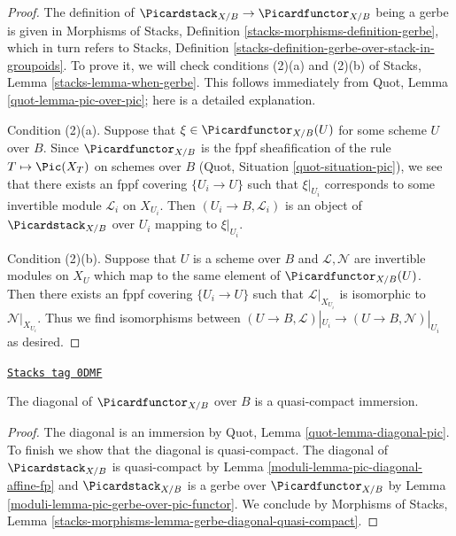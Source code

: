 \begin{proof}
The definition of $\Picardstack_{X/B} \to \Picardfunctor_{X/B}$ being
a gerbe is given in Morphisms of Stacks, Definition
\ref{stacks-morphisms-definition-gerbe}, which in turn refers to
Stacks, Definition \ref{stacks-definition-gerbe-over-stack-in-groupoids}.
To prove it, we will check conditions (2)(a) and (2)(b) of
Stacks, Lemma \ref{stacks-lemma-when-gerbe}. This follows immediately from
Quot, Lemma \ref{quot-lemma-pic-over-pic}; here is a detailed explanation.

\medskip\noindent
Condition (2)(a).
Suppose that $\xi \in \Picardfunctor_{X/B}(U)$ for some scheme $U$ over $B$.
Since $\Picardfunctor_{X/B}$ is the fppf sheafification of the rule
$T \mapsto \Pic(X_T)$ on schemes over $B$
(Quot, Situation \ref{quot-situation-pic}), we see that there exists an
fppf covering $\{U_i \to U\}$ such that $\xi|_{U_i}$ corresponds
to some invertible module $\mathcal{L}_i$ on $X_{U_i}$.
Then $(U_i \to B, \mathcal{L}_i)$ is an object of
$\Picardstack_{X/B}$ over $U_i$ mapping to $\xi|_{U_i}$.

\medskip\noindent
Condition (2)(b). Suppose that $U$ is a scheme over $B$ and
$\mathcal{L}, \mathcal{N}$ are invertible modules on $X_U$
which map to the same element of $\Picardfunctor_{X/B}(U)$.
Then there exists an fppf covering $\{U_i \to U\}$
such that $\mathcal{L}|_{X_{U_i}}$ is isomorphic to $\mathcal{N}|_{X_{U_i}}$.
Thus we find isomorphisms between
$(U \to B, \mathcal{L})|_{U_i} \to (U \to B, \mathcal{N})|_{U_i}$
as desired.
\end{proof}

\begin{lemma}
\label{moduli-lemma-pic-functor-diagonal-qc-immersion}
\href{https://stacks.math.columbia.edu/tag/0DMF}{\texttt{Stacks tag 0DMF}}

The diagonal of $\Picardfunctor_{X/B}$ over $B$ is a quasi-compact immersion.
\end{lemma}

\begin{proof}

The diagonal is an immersion by Quot, Lemma \ref{quot-lemma-diagonal-pic}.
To finish we show that the diagonal is quasi-compact.
The diagonal of $\Picardstack_{X/B}$ is quasi-compact
by Lemma \ref{moduli-lemma-pic-diagonal-affine-fp} and
$\Picardstack_{X/B}$ is a gerbe over $\Picardfunctor_{X/B}$ by
Lemma \ref{moduli-lemma-pic-gerbe-over-pic-functor}.
We conclude by Morphisms of Stacks, Lemma
\ref{stacks-morphisms-lemma-gerbe-diagonal-quasi-compact}.
\end{proof}

